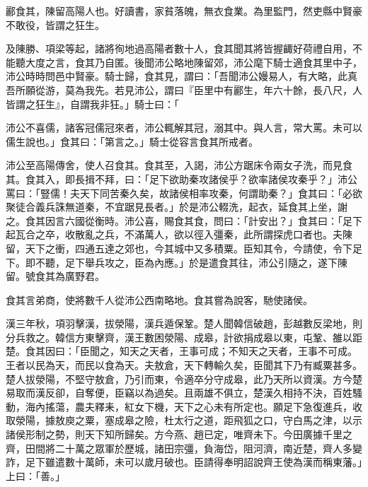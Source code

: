 
\begin{pinyinscope}
酈食其，陳留高陽人也。好讀書，家貧落魄，無衣食業。為里監門，然吏縣中賢豪不敢役，皆謂之狂生。

及陳勝、項梁等起，諸將徇地過高陽者數十人，食其聞其將皆握齱好荷禮自用，不能聽大度之言，食其乃自匿。後聞沛公略地陳留郊，沛公麾下騎士適食其里中子，沛公時時問邑中賢豪。騎士歸，食其見，謂曰：「吾聞沛公嫚易人，有大略，此真吾所願從游，莫為我先。若見沛公，謂曰『臣里中有酈生，年六十餘，長八尺，人皆謂之狂生』，自謂我非狂。」騎士曰：「

沛公不喜儒，諸客冠儒冠來者，沛公輒解其冠，溺其中。與人言，常大罵。未可以儒生說也。」食其曰：「第言之。」騎士從容言食其所戒者。

沛公至高陽傳舍，使人召食其。食其至，入謁，沛公方踞床令兩女子洗，而見食其。食其入，即長揖不拜，曰：「足下欲助秦攻諸侯乎？欲率諸侯攻秦乎？」沛公罵曰：「豎儒！夫天下同苦秦久矣，故諸侯相率攻秦，何謂助秦？」食其曰：「必欲聚徒合義兵誅無道秦，不宜踞見長者。」於是沛公輟洗，起衣，延食其上坐，謝之。食其因言六國從衡時。沛公喜，賜食其食，問曰：「計安出？」食其曰：「足下起瓦合之卒，收散亂之兵，不滿萬人，欲以徑入彊秦，此所謂探虎口者也。夫陳留，天下之衝，四通五達之郊也，今其城中又多積粟。臣知其令，今請使，令下足下。即不聽，足下舉兵攻之，臣為內應。」於是遣食其往，沛公引隨之，遂下陳留。號食其為廣野君。

食其言弟商，使將數千人從沛公西南略地。食其嘗為說客，馳使諸侯。

漢三年秋，項羽擊漢，拔滎陽，漢兵遁保鞏。楚人聞韓信破趙，彭越數反梁地，則分兵救之。韓信方東擊齊，漢王數困滎陽、成皋，計欲捐成皋以東，屯鞏、雒以距楚。食其因曰：「臣聞之，知天之天者，王事可成；不知天之天者，王事不可成。王者以民為天，而民以食為天。夫敖倉，天下轉輸久矣，臣聞其下乃有臧粟甚多。楚人拔滎陽，不堅守敖倉，乃引而東，令適卒分守成皋，此乃天所以資漢。方今楚易取而漢反卻，自奪便，臣竊以為過矣。且兩雄不俱立，楚漢久相持不決，百姓騷動，海內搖蕩，農夫釋耒，紅女下機，天下之心未有所定也。願足下急復進兵，收取滎陽，據敖庾之粟，塞成皋之險，杜太行之道，距飛狐之口，守白馬之津，以示諸侯形制之勢，則天下知所歸矣。方今燕、趙已定，唯齊未下。今田廣據千里之齊，田間將二十萬之眾軍於歷城，諸田宗彊，負海岱，阻河濟，南近楚，齊人多變詐，足下雖遣數十萬師，未可以歲月破也。臣請得奉明詔說齊王使為漢而稱東藩。」上曰：「善。」


\end{pinyinscope}
